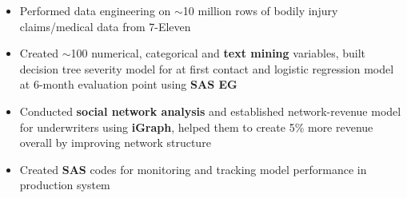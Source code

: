 \documentclass[10.5pt]{res} %
\begin{document}
\begin{resume}
		\begin{itemize}  pt
			\item Performed data engineering on $\sim$10 million rows of bodily injury claims/medical data from 7-Eleven  
			\item Created $\sim$100 numerical, categorical and \textbf{text mining} variables, built {decision tree} severity model for at first contact and {logistic regression} model at 6-month evaluation point using \textbf{SAS EG} %
			\item  Conducted \textbf{social network analysis} and established network-revenue model for underwriters using \textbf{iGraph}, helped them to create 5\% more revenue overall by improving network structure 
			\item Created \textbf{SAS} codes for monitoring and tracking model performance in production system

\end{itemize}
\end{resume}
\end{document}
